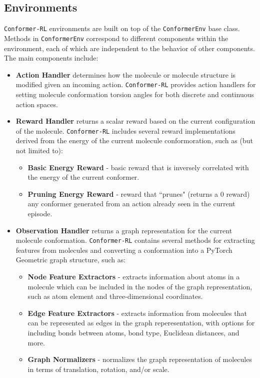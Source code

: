 \documentclass[twoside,11pt]{article}
\newcommand{\code}[1]{\texttt{#1}}
\newcommand{\titleofpaper}{Conformer-RL}
\newcommand{\genComment}[2]{\ifnum\comments=1{\color{#1}{\textsf{\footnotesize #2}}}\fi}
\newcommand{\tarun}[1] {\genComment{blue}{[TG: #1]}}
\begin{document}
\subsection{Environments}
\code{\titleofpaper} environments are built on top of the \code{ConformerEnv} base class. Methods in \code{ConformerEnv} correspond to different components within the environment, each of which are independent to the behavior of other components. The main components include:
\begin{itemize}
  \item \textbf{Action Handler} determines how the molecule or molecule structure is modified given an incoming action. \code{\titleofpaper} provides action handlers for setting molecule conformation torsion angles for both discrete and continuous action spaces.
  
  \item \textbf{Reward Handler} returns a scalar reward based on the current configuration of the molecule. \code{\titleofpaper} includes several reward implementations derived from the energy of the current molecule conformoration, such as (but not limited to):
  \begin{itemize}
    \item \textbf{Basic Energy Reward} - basic reward that is inversely correlated with the energy of the current conformer.
    \item \textbf{Pruning Energy Reward} - reward that ``prunes" (returns a 0 reward) any conformer generated from an action already seen in the current episode.
  \end{itemize}

  \item \textbf{Observation Handler} returns a graph representation for the current molecule conformation. \code{\titleofpaper} contains several methods for extracting features from molecules and converting a conformation into a PyTorch Geometric graph structure, such as:
  \begin{itemize}
    \item \textbf{Node Feature Extractors} - extracts information about atoms in a molecule which can be included in the nodes of the graph representation, such as atom element and three-dimensional coordinates.
    \item \textbf{Edge Feature Extractors} - extracts information from molecules that can be represented as edges in the graph reperesentation, with options for including bonds between atoms, bond type, Euclidean distances, and more.
    \item \textbf{Graph Normalizers} - normalizes the graph representation of molecules in terms of translation, rotation, and/or scale.
  \end{itemize}

\end{itemize}
\end{document}
